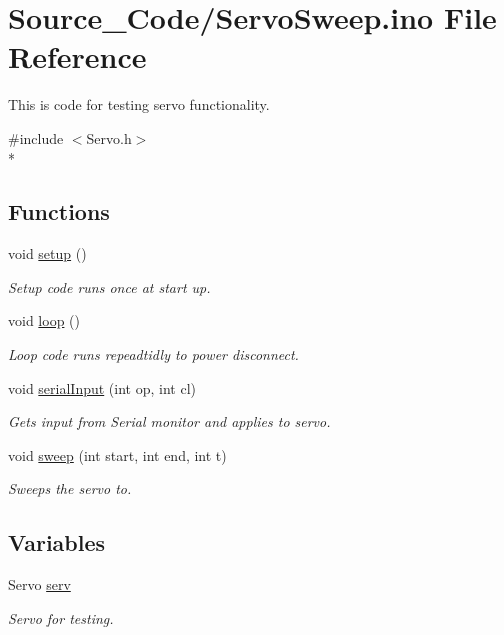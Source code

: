 \hypertarget{_servo_sweep_8ino}{\section{Source\-\_\-\-Code/\-Servo\-Sweep.ino File Reference}
\label{_servo_sweep_8ino}
}


This is code for testing servo functionality.  


{\ttfamily \#include $<$Servo.\-h$>$}\\*
\subsection*{Functions}
\begin{DoxyCompactItemize}
\item 
void \hyperlink{_servo_sweep_8ino_a4fc01d736fe50cf5b977f755b675f11d}{setup} ()
\begin{DoxyCompactList}\small\item\em Setup code runs once at start up. \end{DoxyCompactList}\item 
void \hyperlink{_servo_sweep_8ino_afe461d27b9c48d5921c00d521181f12f}{loop} ()
\begin{DoxyCompactList}\small\item\em Loop code runs repeadtidly to power disconnect. \end{DoxyCompactList}\item 
void \hyperlink{_servo_sweep_8ino_a743e12b5e680cfb12894b00d603d8615}{serial\-Input} (int op, int cl)
\begin{DoxyCompactList}\small\item\em Gets input from Serial monitor and applies to servo. \end{DoxyCompactList}\item 
void \hyperlink{_servo_sweep_8ino_a28ce3d1389c3b021d9ad0a86770dbeb7}{sweep} (int start, int end, int t)
\begin{DoxyCompactList}\small\item\em Sweeps the servo to. \end{DoxyCompactList}\end{DoxyCompactItemize}
\subsection*{Variables}
\begin{DoxyCompactItemize}
\item 
\hypertarget{_servo_sweep_8ino_a9488c8d7a3c4603f10af1b9985a0fedf}{Servo \hyperlink{_servo_sweep_8ino_a9488c8d7a3c4603f10af1b9985a0fedf}{serv}}\label{_servo_sweep_8ino_a9488c8d7a3c4603f10af1b9985a0fedf}

\begin{DoxyCompactList}\small\item\em Servo for testing. \end{DoxyCompactList}\end{DoxyCompactItemize}


